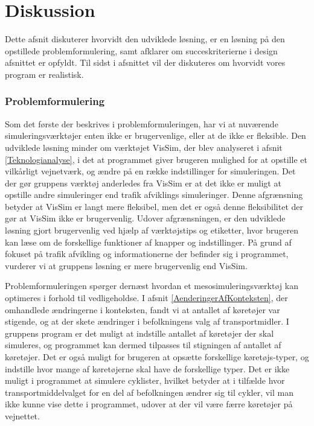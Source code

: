 \chapter{Diskussion}



Dette afsnit diskuterer hvorvidt den udviklede løsning, er en løsning på den opstillede problemformulering, samt afklarer om succeskriterierne i design afsnittet er opfyldt. Til sidst i afsnittet vil der diskuteres om hvorvidt vores program er realistisk.

\subsection{Problemformulering}\label{diskproblem}
Som det første der beskrives i problemformuleringen, har vi at nuværende simuleringsværktøjer enten ikke er brugervenlige, eller at de ikke er fleksible. Den udviklede løsning minder om værktøjet VisSim, der blev analyseret i afsnit \ref{Teknologianalyse}, i det at programmet giver brugeren mulighed for at opstille et vilkårligt vejnetværk, og ændre på en række indstillinger for simuleringen. Det der gør gruppens værktøj anderledes fra VisSim er at det ikke er muligt at opstille andre simuleringer end trafik afviklings simuleringer. Denne afgrænsning betyder at VisSim er langt mere fleksibel, men det er også denne fleksibilitet der gør at VisSim ikke er brugervenlig. Udover afgrænsningen, er den udviklede løsning gjort brugervenlig ved hjælp af værktøjstips og etiketter, hvor brugeren kan læse om de forskellige funktioner af knapper og indstillinger. På grund af fokuset på trafik afvikling og informationerne der befinder sig i programmet, vurderer vi at gruppens løsning er mere brugervenlig end VisSim.

\vspace{5mm}
Problemformuleringen spørger dernæst hvordan et mesosimuleringsværktøj kan optimeres i forhold til vedligeholdse. I afsnit \ref{AenderingerAfKonteksten}, der omhandlede ændringerne i konteksten, fandt vi at antallet af køretøjer var stigende, og at der skete ændringer i befolkningens valg af transportmidler. I gruppens program er det muligt at indstille antallet af køretøjer der skal simuleres, og programmet kan dermed tilpasses til stigningen af antallet af køretøjer. Det er også muligt for brugeren at opsætte forskellige køretøjs-typer, og indstille hvor mange af køretøjerne skal have de forskellige typer. Det er ikke muligt i programmet at simulere cyklister, hvilket betyder at i tilfælde hvor transportmiddelvalget for en del af befolkningen ændrer sig til cykler, vil man ikke kunne vise dette i programmet, udover at der vil være færre køretøjer på vejnettet. 

